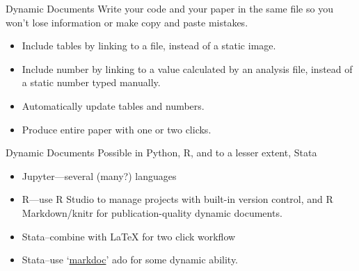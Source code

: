 \documentclass{beamer}
\begin{document}
\begin{frame}{Dynamic Documents}
Write your code and your paper in the same file so you won't lose information or make copy and paste mistakes.

\begin{itemize}[<.->]
\item Include tables by linking to a file, instead of a static image.
\item Include number by linking to a value calculated by an analysis file, instead of a static number typed manually.
\item Automatically update tables and numbers.
\item Produce entire paper with one or two clicks.
\end{itemize} 
\end{frame}

\begin{frame}{Dynamic Documents}
Possible in Python, R, and to a lesser extent, Stata

\begin{itemize}[<.->]
\item Jupyter---several (many?) languages
\item R---use R Studio to manage projects with built-in version control, and R Markdown/knitr for publication-quality dynamic documents.
\item Stata--combine with LaTeX for two click workflow
\item Stata--use `\href{https://github.com/haghish/MarkDoc}{markdoc}' ado for some dynamic ability.
\end{itemize} 
\end{frame}

 
 { %
    \begin{frame}[plain, label=AEAreg]
     \end{frame}
}
\end{document}
